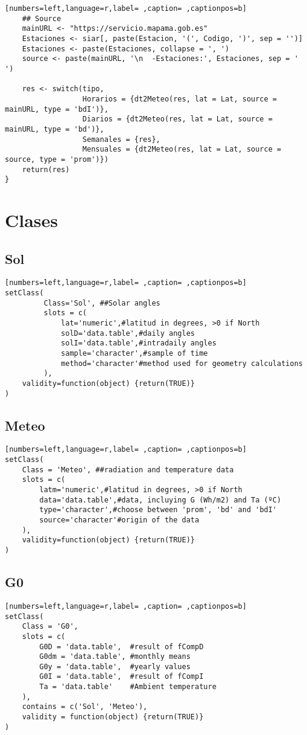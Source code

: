 \begin{lstlisting}[numbers=left,language=r,label= ,caption= ,captionpos=b]
    ## Source
    mainURL <- "https://servicio.mapama.gob.es"
    Estaciones <- siar[, paste(Estacion, '(', Codigo, ')', sep = '')]
    Estaciones <- paste(Estaciones, collapse = ', ')
    source <- paste(mainURL, '\n  -Estaciones:', Estaciones, sep = ' ')

    res <- switch(tipo,
                  Horarios = {dt2Meteo(res, lat = Lat, source = mainURL, type = 'bdI')},
                  Diarios = {dt2Meteo(res, lat = Lat, source = mainURL, type = 'bd')},
                  Semanales = {res},
                  Mensuales = {dt2Meteo(res, lat = Lat, source = source, type = 'prom')})
    return(res)
}
\end{lstlisting}

\section{Clases}
\label{sec:orgd2fd67c}
\subsection{Sol}
\label{sec:org18a6ded}
\begin{lstlisting}[numbers=left,language=r,label= ,caption= ,captionpos=b]
setClass(
         Class='Sol', ##Solar angles
         slots = c(
             lat='numeric',#latitud in degrees, >0 if North
             solD='data.table',#daily angles
             solI='data.table',#intradaily angles
             sample='character',#sample of time
             method='character'#method used for geometry calculations
         ),
    validity=function(object) {return(TRUE)}
)
\end{lstlisting}
\subsection{Meteo}
\label{sec:org073ca01}
\begin{lstlisting}[numbers=left,language=r,label= ,caption= ,captionpos=b]
setClass(
    Class = 'Meteo', ##radiation and temperature data
    slots = c(
        latm='numeric',#latitud in degrees, >0 if North
        data='data.table',#data, incluying G (Wh/m2) and Ta (ºC)
        type='character',#choose between 'prom', 'bd' and 'bdI'
        source='character'#origin of the data
    ),
    validity=function(object) {return(TRUE)}
)
\end{lstlisting}
\subsection{G0}
\label{sec:org35183eb}
\begin{lstlisting}[numbers=left,language=r,label= ,caption= ,captionpos=b]
setClass(
    Class = 'G0',
    slots = c(
        G0D = 'data.table',  #result of fCompD
        G0dm = 'data.table', #monthly means
        G0y = 'data.table',  #yearly values
        G0I = 'data.table',  #result of fCompI
        Ta = 'data.table'    #Ambient temperature
    ),
    contains = c('Sol', 'Meteo'),
    validity = function(object) {return(TRUE)}
)

\end{lstlisting}
